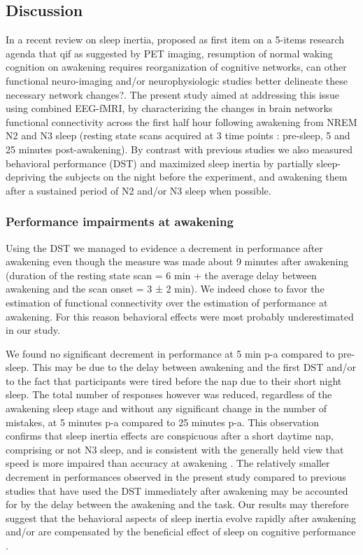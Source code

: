 \subsection*{Discussion}
\label{res:inertia:inertia:discussion}

In a recent review on sleep inertia, \citet{trotti_waking_2016} proposed as first item on a 5-items research agenda that q{if as suggested by PET imaging, resumption of normal waking cognition on awakening requires reorganization of cognitive networks, can other functional neuro-imaging and/or neurophysiologic studies better delineate these necessary network changes?}. The present study aimed at addressing this issue using combined EEG-fMRI, by characterizing the changes in brain networks functional connectivity across the first half hour following awakening from NREM N2 and N3 sleep (resting state scans acquired at 3 time points : pre-sleep, 5 and 25 minutes post-awakening). By contrast with previous studies we also measured behavioral performance (DST) and maximized sleep inertia by partially sleep-depriving the subjects on the night before the experiment, and awakening them after a sustained period of N2 and/or N3 sleep when possible.

\subsubsection*{Performance impairments at awakening}
Using the DST we managed to evidence a decrement in performance after awakening even though the measure was made about 9 minutes after awakening (duration of the resting state scan = 6 min + the average delay between awakening and the scan onset = 3 ± 2 min). We indeed chose to favor the estimation of functional connectivity over the estimation of performance at awakening. For this reason behavioral effects were most probably underestimated in our study.

We found no significant decrement in performance at 5 min p-a compared to pre-sleep. This may be due to the delay between awakening and the first DST and/or to the fact that participants were tired before the nap due to their short night sleep. The total number of responses however was reduced, regardless of the awakening sleep stage and without any significant change in the number of mistakes, at 5 minutes p-a compared to 25 minutes p-a. This observation confirms that sleep inertia effects are conspicuous after a short daytime nap, comprising or not N3 sleep, and is consistent with the generally held view that speed is more impaired than accuracy at awakening \citep{tassi_sleep_2000, trotti_waking_2016}. The relatively smaller decrement in performances observed in the present study compared to previous studies that have used the DST immediately after awakening \citep{dinges_assessing_1985, evans_recovery_1975, stampi_ultrashort_1990} may be accounted for by the delay between the awakening and the task. Our results may therefore suggest that the behavioral aspects of sleep inertia evolve rapidly after awakening and/or are compensated by the beneficial effect of sleep on cognitive performance \citep{faraut_napping:_2016}.

